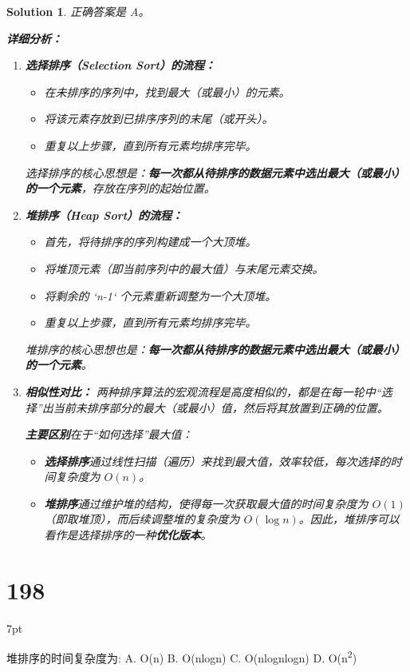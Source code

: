 \documentclass[UTF8]{report}
\newtheorem{solution}{Solution}
\theoremstyle{MyLineTheoremStyle} %
\theoremstyle{MyBlockTheoremStyle} %
\theoremstyle{MySubsubsectionStyle} %
\newenvironment{graybox}{%
        \def\FrameCommand{%
        \hspace{1pt}%
        {\color{gray}\small \vrule width 2pt}%
        {\color{graybox_color}\vrule width 4pt}%
        \colorbox{graybox_color}%
        }%
        \MakeFramed{\advance\hsize-\width\FrameRestore}%
        \noindent\hspace{-4.55pt}%
        \begin{adjustwidth}{}{7pt}%
        \vspace{2pt}\vspace{2pt}%
        }
        {%
        \vspace{2pt}\end{adjustwidth}\endMakeFramed%
        }
\begin{document}
\begin{solution}
正确答案是 A。

\textbf{详细分析：}

\begin{enumerate}
    \item \textbf{选择排序（Selection Sort）的流程：}
    \begin{itemize}
        \item 在未排序的序列中，找到最大（或最小）的元素。
        \item 将该元素存放到已排序序列的末尾（或开头）。
        \item 重复以上步骤，直到所有元素均排序完毕。
    \end{itemize}
    选择排序的核心思想是：\textbf{每一次都从待排序的数据元素中选出最大（或最小）的一个元素}，存放在序列的起始位置。

    \item \textbf{堆排序（Heap Sort）的流程：}
    \begin{itemize}
        \item 首先，将待排序的序列构建成一个大顶堆。
        \item 将堆顶元素（即当前序列中的最大值）与末尾元素交换。
        \item 将剩余的 `n-1` 个元素重新调整为一个大顶堆。
        \item 重复以上步骤，直到所有元素均排序完毕。
    \end{itemize}
    堆排序的核心思想也是：\textbf{每一次都从待排序的数据元素中选出最大（或最小）的一个元素}。

    \item \textbf{相似性对比：}
    两种排序算法的宏观流程是高度相似的，都是在每一轮中“选择”出当前未排序部分的最大（或最小）值，然后将其放置到正确的位置。

    \textbf{主要区别}在于“如何选择”最大值：
    \begin{itemize}
        \item \textbf{选择排序}通过线性扫描（遍历）来找到最大值，效率较低，每次选择的时间复杂度为 $O(n)$。
        \item \textbf{堆排序}通过维护堆的结构，使得每一次获取最大值的时间复杂度为 $O(1)$（即取堆顶），而后续调整堆的复杂度为 $O(\log n)$。因此，堆排序可以看作是选择排序的一种\textbf{优化版本}。
    \end{itemize}
\end{enumerate}
\end{solution}

\section*{198}
\begin{graybox}
堆排序的时间复杂度为:
A. O(n)
B. O(nlogn)
C. O(nlognlogn)
D. O(n\textsuperscript{2})
\end{graybox}
\end{document}
